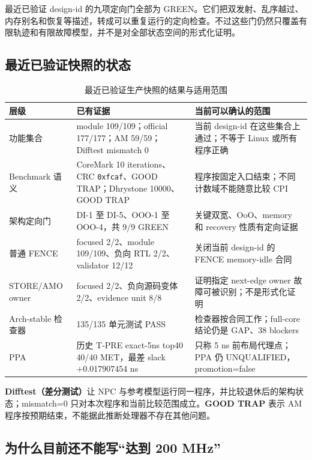 \documentclass[UTF8,a4paper,zihao=-4,oneside]{ctexart}
\begin{document}
最近已验证 design-id 的九项定向门全部为 GREEN。它们把双发射、乱序越过、内存别名和恢复等描述，转成可以重复运行的定向检查。不过这些门仍然只覆盖有限轨迹和有限故障模型，并不是对全部状态空间的形式化证明。

\subsection{最近已验证快照的状态}

\begin{table}[H]
  \centering
  \small
  \caption{最近已验证生产快照的结果与适用范围}
  \label{tab:current-status}
  \begin{tabularx}{\linewidth}{@{}L{29mm}L{49mm}Y@{}}
    \toprule
    层级 & 已有证据 & 当前可以确认的范围 \\
    \midrule
    功能集合
      & module 109/109；official 177/177；AM 59/59；Difftest mismatch 0
      & 当前 design-id 在这些集合上通过；不等于 Linux 或所有程序正确 \\
    Benchmark 语义
      & CoreMark 10 iterations、CRC \texttt{0xfcaf}、GOOD TRAP；Dhrystone 10000、GOOD TRAP
      & 程序按固定入口结束；不同计数域不能随意比较 CPI \\
    架构定向门
      & DI-1 至 DI-5、OOO-1 至 OOO-4，共 9/9 GREEN
      & 关键双宽、OoO、memory 和 recovery 性质有定向证据 \\
    普通 FENCE
      & focused 2/2、module 109/109、负向 RTL 2/2、validator 12/12
      & 关闭当前 design-id 的 FENCE memory-idle 合同 \\
    STORE/AMO owner
      & focused 2/2、负向源码变体 2/2、evidence unit 8/8
      & 证明指定 next-edge owner 故障可被识别；不是形式化证明 \\
    Arch-stable 检查器
      & 135/135 单元测试 PASS
      & 检查器按合同工作；full-core 结论仍是 GAP、38 blockers \\
    PPA
      & 历史 T-PRE exact-5ns top40 40/40 MET，最差 slack $+0.017907454$ ns
      & 只称 5 ns 前布局代理点；PPA 仍 UNQUALIFIED，promotion=false \\
    \bottomrule
  \end{tabularx}
\end{table}

\textbf{Difftest（差分测试）}让 NPC 与参考模型运行同一程序，并比较退休后的架构状态；mismatch=0 只对本次程序和当前比较范围成立。\textbf{GOOD TRAP} 表示 AM 程序按预期结束，不能据此推断处理器不存在其他问题。

\subsection{为什么目前还不能写“达到 200 MHz”}
\end{document}
